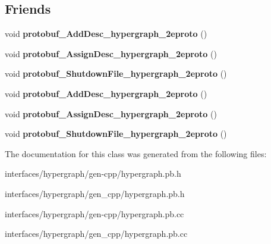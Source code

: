 \subsection*{Friends}
\begin{DoxyCompactItemize}
\item 
\hypertarget{classHypergraph_aed4781a70bb54c95ce4bb1aa4f20b05c}{
void {\bfseries protobuf\_\-AddDesc\_\-hypergraph\_\-2eproto} ()}
\label{classHypergraph_aed4781a70bb54c95ce4bb1aa4f20b05c}

\item 
\hypertarget{classHypergraph_a3cbaa41d7f7b73db437c4e7d1edcb4f3}{
void {\bfseries protobuf\_\-AssignDesc\_\-hypergraph\_\-2eproto} ()}
\label{classHypergraph_a3cbaa41d7f7b73db437c4e7d1edcb4f3}

\item 
\hypertarget{classHypergraph_a424acd7e96228bbed0dba9436582d3c1}{
void {\bfseries protobuf\_\-ShutdownFile\_\-hypergraph\_\-2eproto} ()}
\label{classHypergraph_a424acd7e96228bbed0dba9436582d3c1}

\item 
\hypertarget{classHypergraph_aed4781a70bb54c95ce4bb1aa4f20b05c}{
void {\bfseries protobuf\_\-AddDesc\_\-hypergraph\_\-2eproto} ()}
\label{classHypergraph_aed4781a70bb54c95ce4bb1aa4f20b05c}

\item 
\hypertarget{classHypergraph_a3cbaa41d7f7b73db437c4e7d1edcb4f3}{
void {\bfseries protobuf\_\-AssignDesc\_\-hypergraph\_\-2eproto} ()}
\label{classHypergraph_a3cbaa41d7f7b73db437c4e7d1edcb4f3}

\item 
\hypertarget{classHypergraph_a424acd7e96228bbed0dba9436582d3c1}{
void {\bfseries protobuf\_\-ShutdownFile\_\-hypergraph\_\-2eproto} ()}
\label{classHypergraph_a424acd7e96228bbed0dba9436582d3c1}

\end{DoxyCompactItemize}


The documentation for this class was generated from the following files:\begin{DoxyCompactItemize}
\item 
interfaces/hypergraph/gen-\/cpp/hypergraph.pb.h\item 
interfaces/hypergraph/gen\_\-cpp/hypergraph.pb.h\item 
interfaces/hypergraph/gen-\/cpp/hypergraph.pb.cc\item 
interfaces/hypergraph/gen\_\-cpp/hypergraph.pb.cc\end{DoxyCompactItemize}
